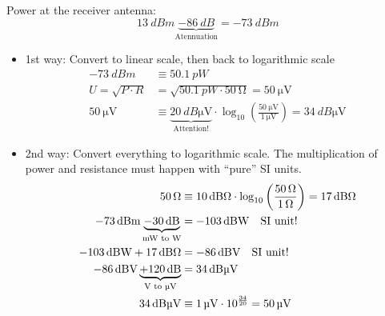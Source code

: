 \begin{solution}
\begin{tasks}
		\task
		Power at the receiver antenna:
		\begin{equation*}
			\SI{13}{dBm} \underbrace{- \SI{86}{dB}}_{\text{Atennuation}} = \SI{-73}{dBm}
		\end{equation*}
		
		\begin{itemize}
			\item 1st way: Convert to linear scale, then back to logarithmic scale
			\begin{equation*}
				\begin{split}
					\SI{-73}{dBm} &\equiv \SI{50.1}{pW} \\
					U = \sqrt{P \cdot R} &= \sqrt{\SI{50.1}{pW} \cdot \SI{50}{\ohm}} = \SI{50}{\micro\volt} \\
					\SI{50}{\micro\volt} &\equiv \underbrace{\SI{20}{dB\micro\volt}}_{\text{Attention!}} \cdot \log_{10}\left(\frac{\SI{50}{\micro\volt}}{\SI{1}{\micro\volt}}\right) = \SI{34}{dB\micro\volt}
				\end{split}
			\end{equation*}
			\item 2nd way: Convert everything to logarithmic scale. The multiplication of power and resistance must happen with ``pure'' SI units.
			\begin{equation*}
			\begin{split}
				\SI{50}{\ohm} &\equiv \SI{10}{dB\ohm} \cdot \log_{10} \left(\frac{\SI{50}{\ohm}}{\SI{1}{\ohm}}\right) = \SI{17}{dB\ohm} \\
				\SI{-73}{dBm} \underbrace{- \SI{30}{dB}}_{\text{\si{mW} to \si{W}}} &= \SI{-103}{dBW} \quad \text{SI unit!} \\
				\SI{-103}{dBW} + \SI{17}{dB\ohm} &= \SI{-86}{dBV} \quad \text{SI unit!} \\
				\SI{-86}{dBV} \underbrace{+ \SI{120}{dB}}_{\text{\si{V} to \si{\micro\volt}}} &= \SI{34}{dB\micro\volt} \\
				\SI{34}{dB\micro\volt} &\equiv \SI{1}{\micro\volt} \cdot 10^{\frac{34}{20}} = \SI{50}{\micro\volt}
			\end{split}
			\end{equation*}
		\end{itemize}
	

\end{tasks}
\end{solution}
